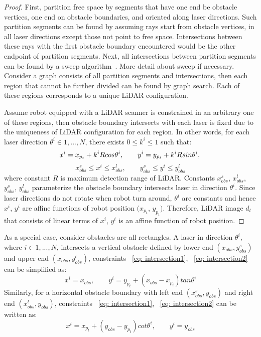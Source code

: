 \begin{proof}
    First, partition free space by segments that have one end be obstacle vertices, one end on obstacle boundaries, 
    and oriented along laser directions.
    Such partition segments can be found by assuming rays start from obstacle vertices,
    in all laser directions except those not point to free space.
    Intersections between these rays with the first obstacle boundary encountered would be the other endpoint of partition segments.
    Next, all intersections between partition segments can be found by a sweep algorithm~\cite{CGbook}. 
    {\color{blue} More detail about sweep if necessary.}
    Consider a graph consists of all partition segments and intersections,
    then each region that cannot be further divided can be found by graph search.
    Each of these regions corresponds to a unique LiDAR configuration.
    
    Assume robot equipped with a LiDAR scanner is constrained in an arbitrary one of these regions, 
    then obstacle boundary intersects with each laser is fixed due to the uniqueness of LiDAR configuration for each region.
    In other words, for each laser direction $\theta^i \in {1, ..., N}$, there exists $0 \le k^i \le 1$ such that:
    \begin{equation}
        \label{eq: intersection1}
        x^i = x_{p_t} + k^i R cos\theta^i, \qquad y^i = y_{p_t} + k^i R sin\theta^i, \\
    \end{equation} 
    \begin{equation}
        \label{eq: intersection2}
        x_{obs}^s \le x^i \le x_{obs}^l, \qquad y_{obs}^s \le y^i \le y_{obs}^l
    \end{equation} 
    where constant $R$ is maximum detection range of LiDAR.
    Constants $x_{obs}^s$, $x_{obs}^l$, $y_{obs}^s$, $y_{obs}^l$ parameterize the obstacle boundary intersects laser in direction $\theta^i$.
    Since laser directions do not rotate when robot turn around,  
    $\theta^i$ are constants and hence $x^i$, $y^i$ are affine functions of robot position $(x_{p_t}$, $y_{p_t})$.
    Therefore, LiDAR image $d_t$ that consists of linear terms of $x^i$, $y^i$ is an affine function of robot position.
\end{proof}

As a special case, consider obstacles are all rectangles. 
A laser in direction $\theta^i$, where $i \in {1, ..., N}$, intersects a vertical obstacle 
defined by lower end $(x_{obs}, y_{obs}^s)$ and upper end $(x_{obs}, y_{obs}^l)$, 
constraints ~\eqref{eq: intersection1}, ~\eqref{eq: intersection2} can be simplified as:
\begin{equation}
    \label{eq:vertical}
    x^i = x_{obs}, \qquad y^i = y_{p_t} + (x_{obs} - x_{p_t}) tan \theta^i
\end{equation}
Similarly, for a horizontal obstacle boundary with left end $(x_{obs}^s, y_{obs})$ and right end $(x_{obs}^l, y_{obs})$,
constraints ~\eqref{eq: intersection1}, ~\eqref{eq: intersection2} can be written as:
\begin{equation} 
    \label{eq:horizontal}
    x^i = x_{p_t} + (y_{obs} - y_{p_t}) cot \theta^i, \qquad y^i = y_{obs}
\end{equation}


